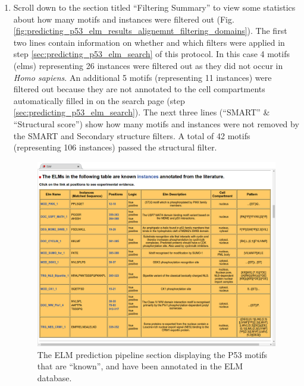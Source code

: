 \documentclass[12pt]{article}
\newcounter{proto}
\begin{document}
\begin{enumerate}
\item Scroll down to the section titled ``Filtering Summary'' to view some
	statistics about how many motifs and instances were filtered out
	(Fig.
	\ref{fig:predicting_p53_elm_results_alignemnt_filtering_domains}).
	The first two lines contain information on whether
	and which filters were applied in step \ref{sec:predicting_p53_elm_search} of this protocol.
	In this case 4 motifs (elms) representing 26 instances were filtered
	out as they did not occur in \textit{Homo sapiens}. An additional 5
	motifs (representing 11 instances) were filtered out because they are
	not annotated to the cell compartments automatically filled in on the
	search page (step \ref{sec:predicting_p53_elm_search}).
	The next three lines (``SMART'' \& ``Structural score'') show how many
	motifs and instances were not removed by the SMART and Secondary
	structure filters. A total of 42 motifs (representing 106 instances)
	passed the structural filter.


\begin{figure}[h!]
	\centering
	\includegraphics[width=\textwidth]{Figures/predicting_p53/elm_results_known.png} 
	\caption{
		The ELM prediction pipeline section displaying the P53 motifs
		that are ``known'', and have been annotated in the ELM
		database.
	}
	\label{fig:predicting_p53_elm_results_known}
\end{figure}


\end{enumerate}
\end{document}
